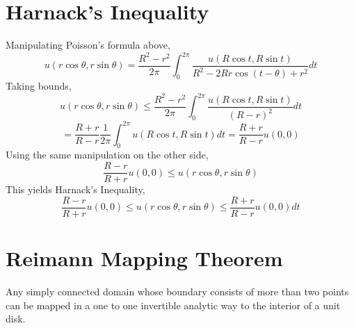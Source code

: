 \documentclass[../main.tex]{subfiles}
\begin{document}
\section{Harnack's Inequality}
Manipulating Poisson's formula above,
$$u(r\cos \theta, r\sin\theta)=\frac{R^{2}-r^{2}}{2\pi}\int_{0}^{2\pi}\frac{u(R\cos t, R\sin t)}{R^{2}-2Rr\cos(t-\theta)+r^{2}}dt$$
Taking bounds,
$$u(r\cos \theta, r\sin\theta)\leq\frac{R^{2}-r^{2}}{2\pi}\int_{0}^{2\pi}\frac{u(R\cos t, R\sin t)}{(R-r)^{2}}dt$$
$$=\frac{R+r}{R-r}\frac{1}{2\pi}\int_{0}^{2\pi}u(R\cos t, R\sin t)dt=\frac{R+r}{R-r}u(0,0)$$
Using the same manipulation on the other side,
$$
\frac{R-r}{R+r}u(0,0)
\leq u(r\cos \theta, r\sin\theta)
$$
This yields Harnack's Inequality,
$$
\frac{R-r}{R+r}u(0,0)
\leq u(r\cos \theta, r\sin\theta)
\leq \frac{R+r}{R-r}u(0,0)dt
$$

\section{Reimann Mapping Theorem}
Any simply connected domain whose boundary consists of more than two points can be mapped in a one to one invertible analytic way
to the interior of a unit disk.
\end{document}
